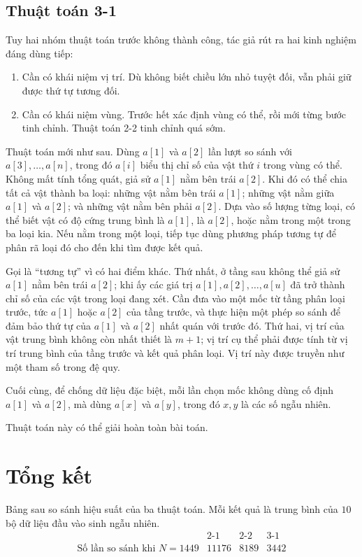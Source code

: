 \documentclass[11pt]{article}
\begin{document}
\subsection{Thuật toán 3-1}

Tuy hai nhóm thuật toán trước không thành công, tác giả rút ra hai kinh
nghiệm đáng dùng tiếp:
\begin{enumerate}
  \item Cần có khái niệm vị trí. Dù không biết chiều lớn nhỏ tuyệt đối, vẫn
  phải giữ được thứ tự tương đối.
  \item Cần có khái niệm vùng. Trước hết xác định vùng có thể, rồi mới từng
  bước tinh chỉnh. Thuật toán 2-2 tinh chỉnh quá sớm.
\end{enumerate}

Thuật toán mới như sau. Dùng $a[1]$ và $a[2]$ lần lượt so sánh với
$a[3],\ldots,a[n]$, trong đó $a[i]$ biểu thị chỉ số của vật thứ $i$ trong vùng
có thể. Không mất tính tổng quát, giả sử $a[1]$ nằm bên trái $a[2]$. Khi đó có
thể chia tất cả vật thành ba loại: những vật nằm bên trái $a[1]$; những vật
nằm giữa $a[1]$ và $a[2]$; và những vật nằm bên phải $a[2]$. Dựa vào số lượng
từng loại, có thể biết vật có độ cứng trung bình là $a[1]$, là $a[2]$, hoặc
nằm trong một trong ba loại kia. Nếu nằm trong một loại, tiếp tục dùng phương
pháp tương tự để phân rã loại đó cho đến khi tìm được kết quả.

Gọi là ``tương tự'' vì có hai điểm khác. Thứ nhất, ở tầng sau không thể giả sử
$a[1]$ nằm bên trái $a[2]$; khi ấy các giá trị $a[1],a[2],\ldots,a[u]$ đã trở
thành chỉ số của các vật trong loại đang xét. Cần đưa vào một mốc từ tầng phân
loại trước, tức $a[1]$ hoặc $a[2]$ của tầng trước, và thực hiện một phép so
sánh để đảm bảo thứ tự của $a[1]$ và $a[2]$ nhất quán với trước đó. Thứ hai,
vị trí của vật trung bình không còn nhất thiết là $m+1$; vị trí cụ thể phải
được tính từ vị trí trung bình của tầng trước và kết quả phân loại. Vị trí này
được truyền như một tham số trong đệ quy.

Cuối cùng, để chống dữ liệu đặc biệt, mỗi lần chọn mốc không dùng cố định
$a[1]$ và $a[2]$, mà dùng $a[x]$ và $a[y]$, trong đó $x,y$ là các số ngẫu
nhiên.

Thuật toán này có thể giải hoàn toàn bài toán.

\section{Tổng kết}

Bảng sau so sánh hiệu suất của ba thuật toán. Mỗi kết quả là trung bình của
$10$ bộ dữ liệu đầu vào sinh ngẫu nhiên.
\[
\begin{array}{c|ccc}
& \text{2-1} & \text{2-2} & \text{3-1}\\
\hline
\text{Số lần so sánh khi } N=1449 & 11176 & 8189 & 3442
\end{array}
\]
\end{document}
